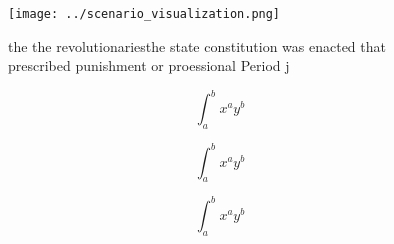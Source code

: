 \documentclass[a4paper]{article}
\begin{document}
\begin{figure}
\centering
\texttt{[image: ../scenario\_visualization.png]}
\caption{ the the revolutionariesthe state constitution was enacted that prescribed punishment or proessional Period j
}
\end{figure}
 
\[ \int_{a}^{b}{x^{a}y^{b}} \]

\[ \int_{a}^{b}{x^{a}y^{b}} \]

\[ \int_{a}^{b}{x^{a}y^{b}} \]
\end{document}

